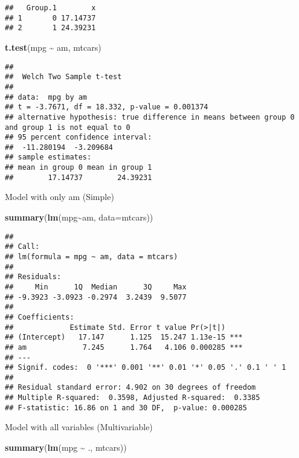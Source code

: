 \documentclass[
]{article}
\newenvironment{Shaded}{\begin{snugshade}}{\end{snugshade}}
\newcommand{\AttributeTok}[1]{\textcolor[rgb]{0.13,0.29,0.53}{#1}}
\newcommand{\FunctionTok}[1]{\textcolor[rgb]{0.13,0.29,0.53}{\textbf{#1}}}
\newcommand{\NormalTok}[1]{#1}
\newcommand{\SpecialCharTok}[1]{\textcolor[rgb]{0.81,0.36,0.00}{\textbf{#1}}}
\begin{document}
\begin{verbatim}
##   Group.1        x
## 1       0 17.14737
## 2       1 24.39231
\end{verbatim}

\begin{Shaded}
\begin{Highlighting}[]
\FunctionTok{t.test}\NormalTok{(mpg }\SpecialCharTok{\textasciitilde{}}\NormalTok{ am, mtcars)}
\end{Highlighting}
\end{Shaded}

\begin{verbatim}
## 
##  Welch Two Sample t-test
## 
## data:  mpg by am
## t = -3.7671, df = 18.332, p-value = 0.001374
## alternative hypothesis: true difference in means between group 0 and group 1 is not equal to 0
## 95 percent confidence interval:
##  -11.280194  -3.209684
## sample estimates:
## mean in group 0 mean in group 1 
##        17.14737        24.39231
\end{verbatim}

Model with only am (Simple)

\begin{Shaded}
\begin{Highlighting}[]
\FunctionTok{summary}\NormalTok{(}\FunctionTok{lm}\NormalTok{(mpg}\SpecialCharTok{\textasciitilde{}}\NormalTok{am, }\AttributeTok{data=}\NormalTok{mtcars))}
\end{Highlighting}
\end{Shaded}

\begin{verbatim}
## 
## Call:
## lm(formula = mpg ~ am, data = mtcars)
## 
## Residuals:
##     Min      1Q  Median      3Q     Max 
## -9.3923 -3.0923 -0.2974  3.2439  9.5077 
## 
## Coefficients:
##             Estimate Std. Error t value Pr(>|t|)    
## (Intercept)   17.147      1.125  15.247 1.13e-15 ***
## am             7.245      1.764   4.106 0.000285 ***
## ---
## Signif. codes:  0 '***' 0.001 '**' 0.01 '*' 0.05 '.' 0.1 ' ' 1
## 
## Residual standard error: 4.902 on 30 degrees of freedom
## Multiple R-squared:  0.3598, Adjusted R-squared:  0.3385 
## F-statistic: 16.86 on 1 and 30 DF,  p-value: 0.000285
\end{verbatim}

Model with all variables (Multivariable)

\begin{Shaded}
\begin{Highlighting}[]
\FunctionTok{summary}\NormalTok{(}\FunctionTok{lm}\NormalTok{(mpg }\SpecialCharTok{\textasciitilde{}}\NormalTok{ ., mtcars))}
\end{Highlighting}
\end{Shaded}
\end{document}
